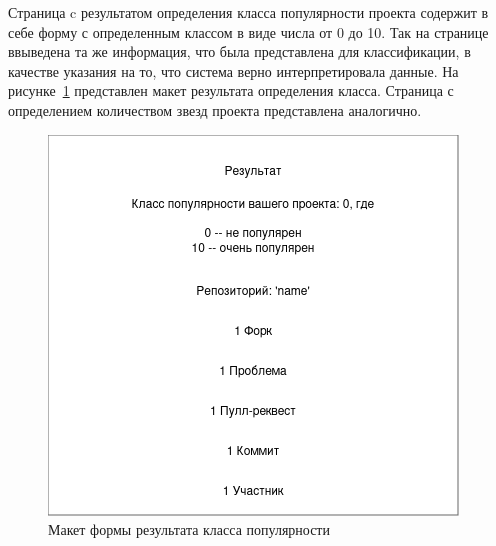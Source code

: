 Страница c результатом определения класса популярности проекта содержит в себе форму с определенным классом в виде числа от 0 до 10. Так на странице ввыведена та же информация, что была представлена для классификации, в качестве указания на то, что система верно интерпретировала данные. На рисунке~\ref{ris:result-form} представлен макет результата определения класса. Страница с определением количеством звезд проекта представлена аналогично.

\begin{figure}[h]
    \centering
    \includegraphics[width=0.8\linewidth]{pic/result-form.png}
    \vspace{0.5em}    \caption{Макет формы результата класса популярности}
    \label{ris:result-form}
\end{figure}
\vspace{1em}
